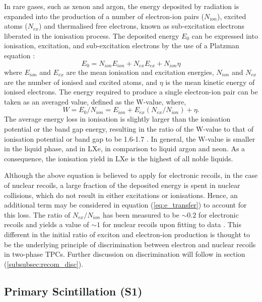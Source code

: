 In rare gases, such as xenon and argon, the energy deposited by radiation is expanded into the production of a number of electron-ion pairs ($N_{ion}$), excited atoms ($N_{ex}$) and thermalised free electrons, known as sub-excitation electrons liberated in the ionisation process. The deposited energy $E_{0}$ can be expressed into ionisation, excitation, and sub-excitation electrons by the use of a Platzman equation \cite{Platzman, xenon_physics}:
%
\begin{equation} \label{eq:e_transfer}
    E_{0} = N_{ion}E_{ion} + N_{ex}E_{ex} + N_{ion}\eta
\end{equation} 
%
where $E_{ion}$ and $E_{ex}$ are the mean ionisation and excitation energies, $N_{ion}$ and $N_{ex}$ are the number of ionised and excited atoms, and $\eta$ is the mean kinetic energy of ionised electrons. The energy required to produce a single electron-ion pair can be taken as an averaged value, defined as the W-value, where,
%
\begin{equation} \label{eq:w_value}
    W = E_{0}/N_{ion} = E_{ion} + E_{ex}(N_{ex}/N_{ion}) + \eta.
\end{equation} 
%
The average energy loss in ionisation is slightly larger than the ionisation potential or the band gap energy, resulting in the ratio of the W-value to that of ionisation potential or band gap to be 1.6-1.7 \cite{PhysRevA.48.1313}. In general, the W-value is smaller in the liquid phase, and in LXe, in comparison to liquid argon and neon. As a consequence, the ionisation yield in LXe is the highest of all noble liquids.

Although the above equation is believed to apply for electronic recoils, in the case of nuclear recoils, a large fraction of the deposited energy is spent in nuclear collisions, which do not result in either excitations or ionisations. Hence, an additional term may be considered in equation (\ref{eq:e_transfer}) to account for this loss. The ratio of $N_{ex}/N_{ion}$ has been measured to be $\sim0.2$ for electronic recoils and yields a value of $\sim1$ for nuclear recoils upon fitting to data \cite{xenon_physics, Dahl}. This different in the initial ratio of exciton and electron-ion production is thought to be the underlying principle of discrimination between electron and nuclear recoils in two-phase TPCs. Further discussion on discrimination will follow in section (\ref{subsubsec:recom_disc}).


\subsection{Primary Scintillation (S1)}
\label{subsec:s1}

